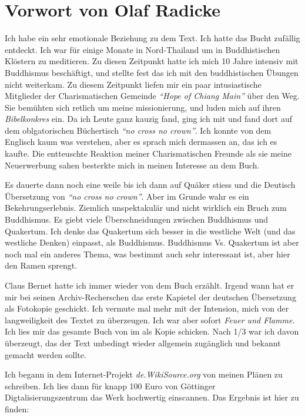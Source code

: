 \chapter{Vorwort von Olaf Radicke}

Ich habe ein sehr emotionale Beziehung zu dem Text. Ich hatte das Bucht zufällig entdeckt. Ich war für einige Monate in Nord-Thailand um in Buddhistischen Klöstern zu meditieren. Zu diesen Zeitpunkt hatte ich mich 10 Jahre intensiv mit Buddhismus beschäftigt, und stellte fest das ich mit den buddhistischen Übungen nicht weiterkam. Zu diesem Zeitpunkt liefen mir ein paar intusiastische Mitglieder der Charismatischen Gemeinde \textit{"`Hope of Chiang Main"'} über den Weg. Sie bemühten sich retlich um meine missionierung, und luden mich auf ihren \textit{Bibelkonkres} ein. Da ich Leute ganz kauzig fand, ging ich mit und fand dort auf dem oblgatorischen Büchertisch \textit{"`no cross no crown"'}. Ich konnte von dem Englisch kaum was verstehen, aber es sprach mich dermassen an, das ich es kaufte. Die entteuschte Reaktion meiner Charismatischen Freunde als sie meine Neuerwerbung sahen besterkte mich in meinen Interesse an dem Buch.

\medskip

Es dauerte dann noch eine weile bis ich dann auf Quäker stiess und die Deutisch Übersetzung von \textit{"`no cross no crown"'}. Aber im Grunde wahr es ein Bekehrungserlebnis. Ziemlich unspektakulär und nicht wirklich ein Bruch zum Buddhismus. Es giebt viele Überschneidungen zwischen Buddhismus und Quakertum. Ich denke das Quakertum sich besser in die westliche Welt (und das westliche Denken) einpasst, als Buddhismus. Buddhismus Vs. Quakertum ist aber noch mal ein anderes Thema, was bestimmt auch sehr interessant ist, aber hier den Ramen sprengt.

\medskip

Claus Bernet hatte ich immer wieder von dem Buch erzählt. Irgend wann hat er mir bei seinen Archiv-Recherschen das erste Kapietel der deutschen Übersetzung als Fotokopie geschickt. Ich vermute mal mehr mit der Intension, mich von der langweiligkeit des Textet zu überzeugen. Ich war aber sofort \textit{Feuer und Flamme}. Ich lies mir das gesamte Buch von im als Kopie schicken. Nach 1/3 war ich davon überzeugt, das der Text unbedingt wieder allgemein zugänglich und bekannt gemacht werden sollte.

\medskip

Ich begann in dem Internet-Projekt \textit{de.WikiSource.org} von meinen Plänen zu schreiben. Ich lies dann für knapp 100 Euro von Göttinger Digtalisierungszentrum das Werk hochwertig einscannen. Das Ergebnis ist hier zu finden:

